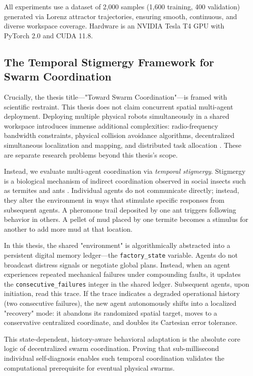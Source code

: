 \documentclass[12pt,a4paper,oneside]{report}
\begin{document}
All experiments use a dataset of 2,000 samples (1,600 training, 400 validation) generated via Lorenz attractor trajectories, ensuring smooth, continuous, and diverse workspace coverage. Hardware is an NVIDIA Tesla T4 GPU with PyTorch 2.0 and CUDA 11.8.

\subsection{The Temporal Stigmergy Framework for Swarm Coordination}

Crucially, the thesis title—"Toward Swarm Coordination"—is framed with scientific restraint. This thesis does not claim concurrent spatial multi-agent deployment. Deploying multiple physical robots simultaneously in a shared workspace introduces immense additional complexities: radio-frequency bandwidth constraints, physical collision avoidance algorithms, decentralized simultaneous localization and mapping, and distributed task allocation \cite{matsuki2024gaussian, keetha2024splattam}. These are separate research problems beyond this thesis's scope.

Instead, we evaluate multi-agent coordination via \textit{temporal stigmergy}. Stigmergy is a biological mechanism of indirect coordination observed in social insects such as termites and ants \cite{bongard2006resilient}. Individual agents do not communicate directly; instead, they alter the environment in ways that stimulate specific responses from subsequent agents. A pheromone trail deposited by one ant triggers following behavior in others. A pellet of mud placed by one termite becomes a stimulus for another to add more mud at that location.

In this thesis, the shared "environment" is algorithmically abstracted into a persistent digital memory ledger—the \texttt{factory\_state} variable. Agents do not broadcast distress signals or negotiate global plans. Instead, when an agent experiences repeated mechanical failures under compounding faults, it updates the \texttt{consecutive\_failures} integer in the shared ledger. Subsequent agents, upon initiation, read this trace. If the trace indicates a degraded operational history (two consecutive failures), the new agent autonomously shifts into a localized "recovery" mode: it abandons its randomized spatial target, moves to a conservative centralized coordinate, and doubles its Cartesian error tolerance.

This state-dependent, history-aware behavioral adaptation is the absolute core logic of decentralized swarm coordination. Proving that sub-millisecond individual self-diagnosis enables such temporal coordination validates the computational prerequisite for eventual physical swarms.
\end{document}
